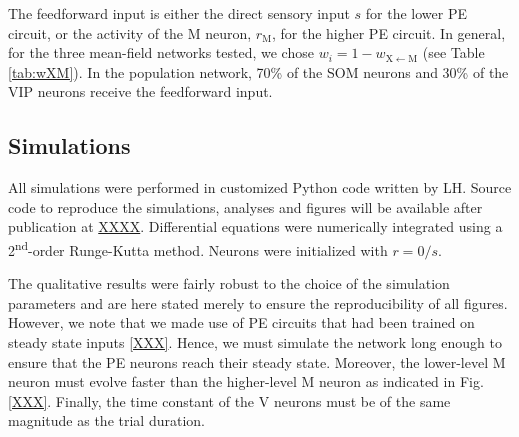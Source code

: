 \documentclass[10pt,a4paper,draft]{article}
\begin{document}
The feedforward input is either the direct sensory input $s$ for the lower PE circuit, or the activity of the M neuron, $r_\mathrm{M}$, for the higher PE circuit. In general, for the three mean-field networks tested, we chose $w_i = 1 - w_\mathrm{X\leftarrow M}$  (see Table \ref{tab:wXM}). In the population network, 70\% of the SOM neurons and 30\% of the VIP neurons receive the feedforward input.


\subsection{Simulations}
%
All simulations were performed in customized Python code written by LH. Source code to reproduce the simulations, analyses and figures will be available after publication at \url{XXXX}. Differential equations were numerically integrated using a 2\textsuperscript{nd}-order Runge-Kutta method. Neurons were initialized with $r=0/s$. 

The qualitative results were fairly robust to the choice of the simulation parameters and are here stated merely to ensure the reproducibility of all figures. However, we note that we made use of PE circuits that had been trained on steady state inputs \ref{XXX}. Hence, we must simulate the network long enough to ensure that the PE neurons reach their steady state. Moreover, the lower-level M neuron must evolve faster than the higher-level M neuron as indicated in Fig. \ref{XXX}. Finally, the time constant of the V neurons must be of the same magnitude as the trial duration.
\end{document}
